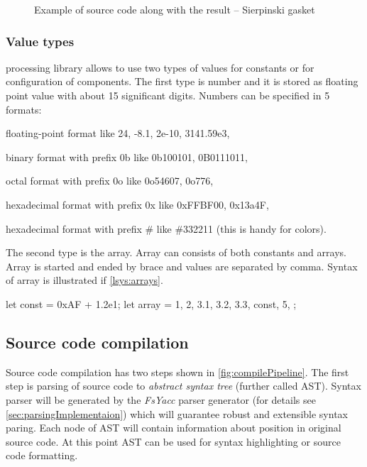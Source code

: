 \begin{figure}[h!]
	\subfloat{
		\usebox{\lstBoxParams}
	} \hfill
	\caption{Example of source code along with the result -- Sierpinski gasket}
	\label{fig:scExample}
\end{figure}


\subsubsection{Value types}

\lsystem processing library allows to use two types of values for constants or for configuration of components.
The first type is number and it is stored as floating point value with about 15 significant digits.
Numbers can be specified in 5 formats:

\begin{itemize*}
	\item floating-point format like 24, -8.1, 2e-10, 3141.59e3,
	\item binary format with prefix 0b like 0b100101, 0B0111011,
	\item octal format with prefix 0o like 0o54607, 0o776,
	\item hexadecimal format with prefix 0x like 0xFFBF00, 0x13a4F,
	\item hexadecimal format with prefix \# like \#332211 (this is handy for colors).
\end{itemize*}

The second type is the array.
Array can consists of both constants and arrays.
Array is started and ended by brace and values are separated by comma.
Syntax of array is illustrated if \autoref{lsys:arrays}.

\begin{Lsystem}[label=lsys:arrays,caption={Example of array syntax.}]
let const = 0xAF + 1.2e1;
let array = {1, 2, {3.1, 3.2, 3.3}, const, 5, {}};
\end{Lsystem}



\subsection{Source code compilation}

Source code compilation has two steps shown in \autoref{fig:compilePipeline}.
The first step is parsing of source code to \emph{abstract syntax tree} (further called AST). 
Syntax parser will be generated by the \emph{FsYacc} parser generator (for details see \autoref{sec:parsingImplementaion}) which will guarantee robust and extensible syntax paring.
Each node of AST will contain information about position in original source code.
At this point AST can be used for syntax highlighting or source code formatting.

